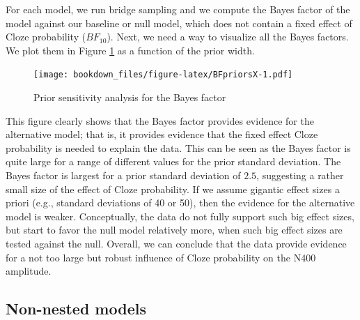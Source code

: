 \documentclass[12pt,]{krantz}
\newenvironment{Shaded}{\begin{snugshade}}{\end{snugshade}}
\newcommand{\KeywordTok}[1]{\textcolor[rgb]{0.13,0.29,0.53}{\textbf{#1}}}
\newcommand{\DataTypeTok}[1]{\textcolor[rgb]{0.13,0.29,0.53}{#1}}
\newcommand{\StringTok}[1]{\textcolor[rgb]{0.31,0.60,0.02}{#1}}
\newcommand{\CommentTok}[1]{\textcolor[rgb]{0.56,0.35,0.01}{\textit{#1}}}
\newcommand{\OtherTok}[1]{\textcolor[rgb]{0.56,0.35,0.01}{#1}}
\newcommand{\OperatorTok}[1]{\textcolor[rgb]{0.81,0.36,0.00}{\textbf{#1}}}
\newcommand{\NormalTok}[1]{#1}
\theoremstyle{definition}
\theoremstyle{definition}
\theoremstyle{definition}
\theoremstyle{remark}
\begin{document}
\begin{Shaded}
\end{Shaded}

For each model, we run bridge sampling and we compute the Bayes factor
of the model against our baseline or null model, which does not contain
a fixed effect of Cloze probability (\(BF_{10}\)). Next, we need a way
to visualize all the Bayes factors. We plot them in Figure
\ref{fig:BFpriorsX} as a function of the prior width.

\begin{figure}
\centering
\texttt{[image: bookdown\_files/figure-latex/BFpriorsX-1.pdf]}
\caption{\label{fig:BFpriorsX}Prior sensitivity analysis for the Bayes
factor}
\end{figure}

This figure clearly shows that the Bayes factor provides evidence for
the alternative model; that is, it provides evidence that the fixed
effect Cloze probability is needed to explain the data. This can be seen
as the Bayes factor is quite large for a range of different values for
the prior standard deviation. The Bayes factor is largest for a prior
standard deviation of \(2.5\), suggesting a rather small size of the
effect of Cloze probability. If we assume gigantic effect sizes a priori
(e.g., standard deviations of 40 or 50), then the evidence for the
alternative model is weaker. Conceptually, the data do not fully support
such big effect sizes, but start to favor the null model relatively
more, when such big effect sizes are tested against the null. Overall,
we can conclude that the data provide evidence for a not too large but
robust influence of Cloze probability on the N400 amplitude.

\subsection{Non-nested models}\label{sec:BFnonnested}
\end{document}
